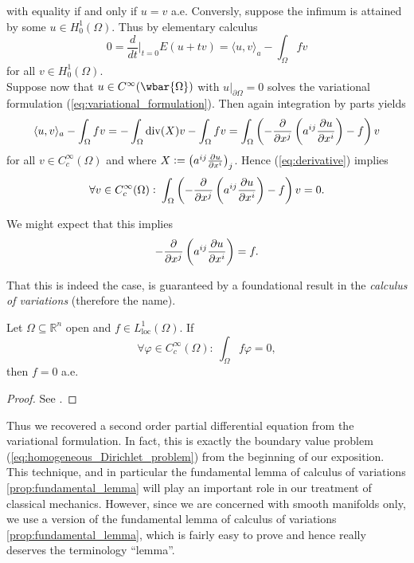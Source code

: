 \noindent with equality if and only if $u = v$ a.e. Conversly, suppose the infimum is attained by some $u \in H^1_0(\Omega)$. Thus by elementary calculus
\begin{equation}
	\label{eq:derivative}
	0 = \frac{d}{dt}\bigg\vert_{t = 0} E(u + tv) = \langle u, v \rangle_a - \int_\Omega f v
\end{equation}
\noindent for all $v \in H^1_0(\Omega)$.\\
Suppose now that $u \in C^\infty(\wbar{\Omega})$ with $u\vert_{\partial \Omega} = 0$ solves the variational formulation (\ref{eq:variational_formulation}). Then again integration by parts yields
\begin{equation*}
	\langle u, v \rangle_a - \int_\Omega f v = -\int_\Omega \mathrm{div}(X) v - \int_\Omega fv = \int_\Omega \del[3]{-\frac{\partial}{\partial x^j}\del[3]{a^{ij}\frac{\partial u}{\partial x^i}} - f} v
\end{equation*}
\noindent for all $v \in C^\infty_c(\Omega)$ and where $X := \del[1]{a^{ij}\frac{\partial u}{\partial x^i}}_j$. Hence (\ref{eq:derivative}) implies 
\begin{equation*}
	\forall v \in C^\infty_c(\Omega): \> \int_\Omega \del[3]{-\frac{\partial}{\partial x^j}\del[3]{a^{ij}\frac{\partial u}{\partial x^i}} - f} v = 0.
\end{equation*}

We might expect that this implies 
\begin{equation*}
	-\frac{\partial}{\partial x^j}\del[3]{a^{ij}\frac{\partial u}{\partial x^i}} = f.
\end{equation*}

That this is indeed the case, is guaranteed by a foundational result in the \emph{calculus of variations} (therefore the name).

\begin{proposition}
	\label{prop:fundamental_lemma}
	Let $\Omega \subseteq \mathbb{R}^n$ open and $f \in L^1_{\mathrm{loc}}(\Omega)$. If
	\begin{equation*}
		\forall \varphi \in C^\infty_c(\Omega): \> \int_\Omega f\varphi = 0,
	\end{equation*}
	\noindent then $f = 0$ a.e.
\end{proposition}

\begin{proof}
	See \cite[40]{struwe:fa:2014}.
\end{proof}

Thus we recovered a second order partial differential equation from the variational formulation. In fact, this is exactly the boundary value problem (\ref{eq:homogeneous_Dirichlet_problem}) from the beginning of our exposition. This technique, and in particular the fundamental lemma of calculus of variations \ref{prop:fundamental_lemma} will play an important role in our treatment of classical mechanics. However, since we are concerned with smooth manifolds only, we use a version of the fundamental lemma of calculus of variations \ref{prop:fundamental_lemma}, which is fairly easy to prove and hence really deserves the terminology ``lemma''.

